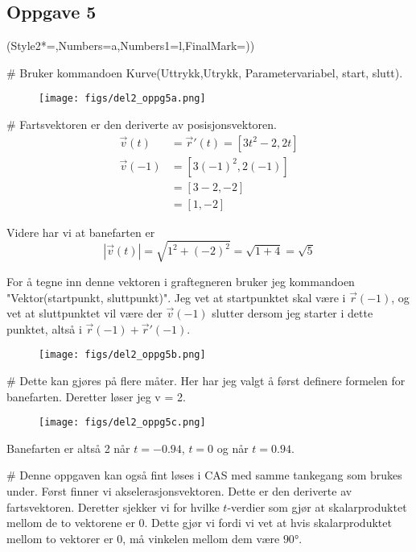 \subsection*{Oppgave 5}

\begin{easylist}[enumerate]
	\ListProperties(Style2*=,Numbers=a,Numbers1=l,FinalMark={)})
	
	# Bruker kommandoen Kurve(Uttrykk,Utrykk, Parametervariabel, start, slutt).
	\begin{figure}[ht!]
		\centering
		\texttt{[image: figs/del2\_oppg5a.png]}
	\end{figure}
	
	# Fartsvektoren er den deriverte av posisjonsvektoren.
	\begin{align*}
			\vec{v}(t) & = \vec{r}'(t)  = [3t^2 -2, 2t] \\
			\vec{v}(-1) & = [3(-1)^2,2(-1)] \\
			& = [3-2,-2] \\
			& = [1,-2] 
	\end{align*}
	
	Videre har vi at banefarten er $$|\vec{v}(t)| = \sqrt{1^2 + (-2)^2} = \sqrt{1 + 4} = \sqrt{5}$$
	
	For å tegne inn denne vektoren i graftegneren bruker jeg kommandoen "Vektor(startpunkt, sluttpunkt)". Jeg vet at startpunktet skal være i $\vec{r}(-1)$, og vet at sluttpunktet vil være der $\vec{v}(-1)$ slutter dersom jeg starter i dette punktet, altså i $\vec{r}(-1) + \vec{r}'(-1)$.

	\begin{figure}[ht!]
		\centering
		\texttt{[image: figs/del2\_oppg5b.png]}
	\end{figure}
	
	\newpage
	# Dette kan gjøres på flere måter. Her har jeg valgt å først definere formelen for banefarten. Deretter løser jeg v = 2. 
		\begin{figure}[ht!]
			\centering
			\texttt{[image: figs/del2\_oppg5c.png]}
		\end{figure}
		
	Banefarten er altså 2 når $t = -0.94$, $t=0$ og når $t = 0.94$.
		
	# Denne oppgaven kan også fint løses i CAS med samme tankegang som brukes under. 
	Først finner vi akselerasjonsvektoren. 
	Dette er den deriverte av fartsvektoren. 
	Deretter sjekker vi for hvilke $t$-verdier som gjør at skalarproduktet mellom de to vektorene er 0. 
	Dette gjør vi fordi vi vet at hvis skalarproduktet mellom to vektorer er 0, må vinkelen mellom dem være $\ang{90}$. 
		

\end{easylist}
